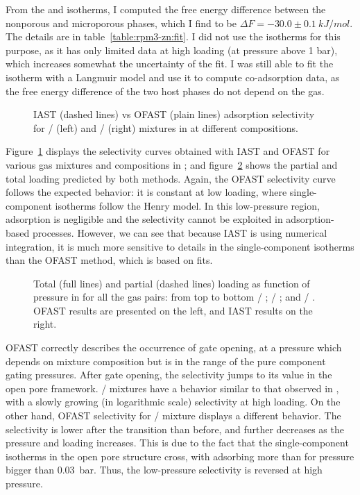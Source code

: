\documentclass[thesis]{subfiles}
\begin{document}
From the  and  isotherms, I computed the free energy
difference between the nonporous and microporous phases, which I find to be
$\Delta F = -30.0 \pm \SI{0.1}{kJ/mol}$. The details are in
table~\ref{table:rpm3-zn:fit}. I did not use the  isotherms for this
purpose, as it has only limited data at high loading (at pressure above 1 bar),
which increases somewhat the uncertainty of the fit. I was still able to fit the
 isotherm with a Langmuir model and use it to compute co-adsorption
data, as the free energy difference of the two host phases do not depend on the
gas.

\begin{figure}[htp]
    \centering
    
    \caption{IAST (dashed lines) vs OFAST (plain lines) adsorption selectivity
    for / (left) and / (right) mixtures
    in \RPMZn at different compositions.}
    \label{fig:rpm3-zn:iast-ofast:selectivity}
\end{figure}

Figure~\ref{fig:rpm3-zn:iast-ofast:selectivity} displays the selectivity curves
obtained with IAST and OFAST for various gas mixtures and compositions in
\RPMZn; and figure~\ref{fig:rpm3-zn:iast-ofast:loadings} shows the partial and
total loading predicted by both methods. Again, the OFAST selectivity curve
follows the expected behavior: it is constant at low loading, where
single-component isotherms follow the Henry model. In this low-pressure region,
adsorption is negligible and the selectivity cannot be exploited in
adsorption-based processes. However, we can see that because IAST is using
numerical integration, it is much more sensitive to details in the
single-component isotherms than the OFAST method, which is based on fits.

\begin{figure}[htp]
    \centering
    
    \caption{Total (full lines) and partial (dashed lines) loading as function
    of pressure in \RPMZn for all the gas pairs: from top to bottom  /
    ;  / ; and  / . OFAST results
    are presented on the left, and IAST results on the right.}
    \label{fig:rpm3-zn:iast-ofast:loadings}
\end{figure}

OFAST correctly describes the occurrence of gate opening, at a pressure which
depends on mixture composition but is in the range of the pure component gating
pressures. After gate opening, the selectivity jumps to its value in the open
pore framework. / mixtures have a behavior similar to that
observed in \Cudhbc, with a slowly growing (in logarithmic scale) selectivity at
high loading. On the other hand, OFAST selectivity for /
mixture displays a different behavior. The selectivity is lower after the
transition than before, and further decreases as the pressure and loading
increases. This is due to the fact that the single-component isotherms in the
open pore structure cross, with  adsorbing more than  for
pressure bigger than \SI{0.03}{bar}. Thus, the low-pressure selectivity is
reversed at high pressure.
\end{document}
